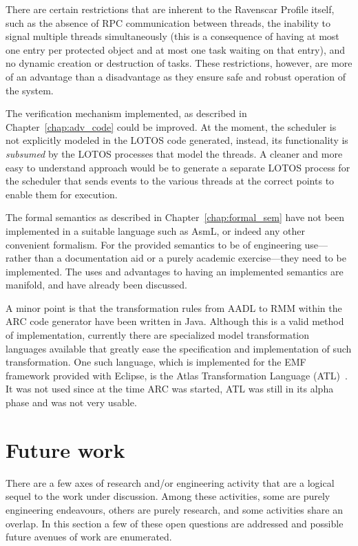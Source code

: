 There are certain restrictions that are inherent to the Ravenscar
Profile itself, such as the absence of RPC communication between
threads, the inability to signal multiple threads simultaneously (this
is a consequence of having at most one entry per protected object and
at most one task waiting on that entry), and no dynamic creation or
destruction of tasks. These restrictions, however, are more of an
advantage than a disadvantage as they ensure safe and robust operation
of the system.

The verification mechanism implemented, as described in
Chapter~\ref{chap:adv_code} could be improved. At the moment, the
scheduler is not explicitly modeled in the LOTOS code generated,
instead, its functionality is \emph{subsumed} by the LOTOS processes
that model the threads. A cleaner and more easy to understand approach
would be to generate a separate LOTOS process for the scheduler that
sends events to the various threads at the correct points to enable
them for execution.

The formal semantics as described in Chapter~\ref{chap:formal_sem}
have not been implemented in a suitable language such as AsmL, or
indeed any other convenient formalism. For the provided semantics to
be of engineering use---rather than a documentation aid or a purely
academic exercise---they need to be implemented. The uses and
advantages to having an implemented semantics are manifold, and have
already been discussed.

A minor point is that the transformation rules from AADL to RMM within
the ARC code generator have been written in Java. Although this is a
valid method of implementation, currently there are specialized model
transformation languages available that greatly ease the specification
and implementation of such transformation. One such language, which is
implemented for the EMF framework provided with Eclipse, is the Atlas
Transformation Language (ATL)~\cite{jouault@oopsla06}. It was not used
since at the time ARC was started, ATL was still in its alpha phase
and was not very usable.

\section{Future work}
There are a few axes of research and/or engineering activity that are
a logical sequel to the work under discussion. Among these activities,
some are purely engineering endeavours, others are purely research,
and some activities share an overlap. In this section a few of these
open questions are addressed and possible future avenues of work are
enumerated.

